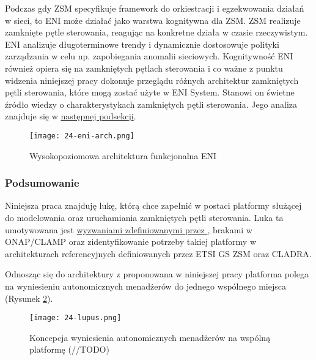Podczas gdy ZSM specyfikuje framework do orkiestracji i egzekwowania działań w sieci, to ENI może działać jako warstwa kognitywna dla ZSM. ZSM realizuje zamknięte pętle sterowania, reagując na konkretne działa w czasie rzeczywistym. ENI analizuje długoterminowe trendy i dynamicznie dostosowuje polityki zarządzania w celu np. zapobiegania anomalii sieciowych. Kognitywność ENI również opiera się na zamkniętych pętlach sterowania i co ważne z punktu widzenia niniejszej pracy \cite{etsieni2024} dokonuje przeglądu różnych architektur zamkniętych pętli sterowania, które mogą zostać użyte w ENI System. Stanowi on świetne źródło wiedzy o charakterystykach zamkniętych pętli sterowania. Jego analiza znajduje się w \hyperlink{sec:25}{następnej podsekcji}.



\begin{figure}[!h]
    \centering \texttt{[image: 24-eni-arch.png]}
    \caption{Wysokopoziomowa architektura funkcjonalna ENI}\label{fig:24-eni-arch}
\end{figure}


\subsubsection{Podsumowanie}

Niniejsza praca znajduję lukę, którą chce zapełnić w postaci platformy służącej do modelowania oraz uruchamiania zamkniętych pętli sterowania. Luka ta umotywowana jest \hyperlink{list:1}{wyzwaniami zdefiniowanymi przez \cite{fallon2019}}, brakami w ONAP/CLAMP oraz zidentyfikowanie potrzeby takiej platformy w architekturach referencyjnych definiowanych przez ETSI GS ZSM oraz CLADRA.

Odnosząc się do architektury z \cite{kephart2003} proponowana w niniejszej pracy platforma polega na wyniesieniu autonomicznych menadżerów do jednego wspólnego miejsca (Rysunek \ref{fig:24-lupus}).

\begin{figure}[!htbp]
    \centering \texttt{[image: 24-lupus.png]}
    \caption{Koncepcja wyniesienia autonomicznych menadżerów na wspólną platformę (//TODO)}\label{fig:24-lupus}
\end{figure}